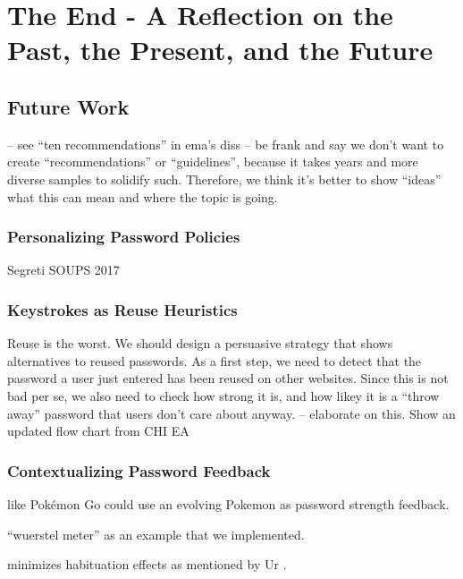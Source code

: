 \chapter[The End - A Reflection on the Past, the Present, and the Future]{The End - A Reflection on the Past, the Present, and the Future}\label{chap:the_end}

\section{Future Work}

-- see ``ten recommendations'' in ema's diss
-- be frank and say we don't want to create ``recommendations'' or ``guidelines'', because it takes years and more diverse samples to solidify such. Therefore, we think it's better to show ``ideas'' what this can mean and where the topic is going. 


\subsection{Personalizing Password Policies}\label{sec:pst:personalizing-policies}

Segreti \etal SOUPS 2017
\cite{Seitz2017PPT}
\cite{Segreti2017AdaptivePolicies}

\subsection{Keystrokes as Reuse Heuristics}
Reuse is the worst. We should design a persuasive strategy that shows alternatives to reused passwords. As a first step, we need to detect that the password a user just entered has been reused on other websites. Since this is not bad per se, we also need to check how strong it is, and how likey it is a ``throw away'' password that users don't care about anyway. -- elaborate on this. Show an updated flow chart from CHI EA 


\subsection{Contextualizing Password Feedback}
like \cite{Kroeze2012GamifyingAuthentication} Pokémon Go could use an evolving Pokemon as password strength feedback. 

``wuerstel meter'' as an example that we implemented.

minimizes habituation effects as mentioned by Ur \etal \cite{Ur2012HelpingUsersCreateBetterPasswords}.

